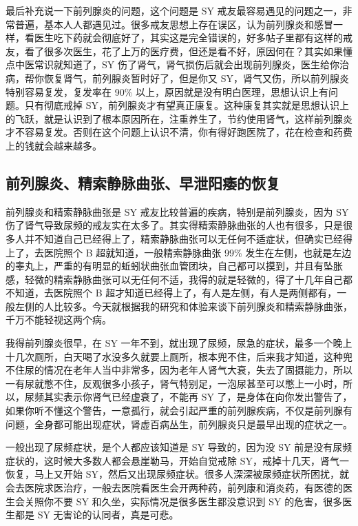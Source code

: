 \documentclass{ctexart}
\begin{document}
最后补充说一下前列腺炎的问题，这个问题是 SY 戒友最容易遇见的问题之一，非常普遍，基本人人都遇见过。很多戒友思想上存在误区，认为前列腺炎和感冒一样，看医生吃下药就会彻底好了，其实这是完全错误的，好多帖子里都有这样的戒友，看了很多次医生，花了上万的医疗费，但还是看不好，原因何在？其实如果懂点中医常识就知道了，SY 伤了肾气，肾气损伤后就会出现前列腺炎，医生给你治病，帮你恢复肾气，前列腺炎暂时好了，但是你又 SY，肾气又伤，所以前列腺炎特别容易复发，复发率在 90\% 以上，原因就是没有明白医理，思想认识上有问题。只有彻底戒掉 SY，前列腺炎才有望真正康复。这种康复其实就是思想认识上的飞跃，就是认识到了根本原因所在，注重养生了，节约使用肾气，这样前列腺炎才不容易复发。否则在这个问题上认识不清，你有得好跑医院了，花在检查和药费上的钱就会越来越多。

\subsection{前列腺炎、精索静脉曲张、早泄阳痿的恢复}

前列腺炎和精索静脉曲张是 SY 戒友比较普遍的疾病，特别是前列腺炎，因为 SY 伤了肾气导致尿频的戒友实在太多了。其实得精索静脉曲张的人也有很多，只是很多人并不知道自己已经得上了，精索静脉曲张可以无任何不适症状，但确实已经得上了，去医院照个 B 超就知道，一般精索静脉曲张 99\% 发生在左侧，也就是左边的睾丸上，严重的有明显的蚯蚓状曲张血管团块，自己都可以摸到，并且有坠胀感，轻微的精索静脉曲张可以无任何不适，我得的就是轻微的，得了十几年自己都不知道，去医院照个 B 超才知道已经得上了，有人是左侧，有人是两侧都有，一般左侧的人比较多。今天就根据我的研究和体验来谈下前列腺炎和精索静脉曲张，千万不能轻视这两个病。

我得前列腺炎很早，在 SY 一年不到，就出现了尿频，尿急的症状，最多一个晚上十几次厕所，白天喝了水没多久就要上厕所，根本兜不住，后来我才知道，这种兜不住尿的情况在老年人当中非常多，因为老年人肾气大衰，失去了固摄能力，所以一有尿就憋不住，反观很多小孩子，肾气特别足，一泡尿甚至可以憋上一小时，所以，尿频其实表示你肾气已经虚衰了，不能再 SY 了，是身体在向你发出警告了，如果你听不懂这个警告，一意孤行，就会引起严重的前列腺疾病，不仅是前列腺有问题，全身都可能出现症状，肾虚百病丛生，前列腺炎只是最早出现的症状之一。

一般出现了尿频症状，是个人都应该知道是 SY 导致的，因为没 SY 前是没有尿频症状的，这时候大多数人都会悬崖勒马，开始自觉戒除 SY，戒掉十几天，肾气一恢复，马上又开始 SY，然后又出现尿频症状。很多人深深被尿频症状所困扰，就会去医院求医治疗，一般去医院看医生会开两种药，前列康和消炎药，有医德的医生会关照你不要 SY 和久坐，实际情况是很多医生都没意识到 SY 的危害，很多医生都是 SY 无害论的认同者，真是可悲。
\end{document}
